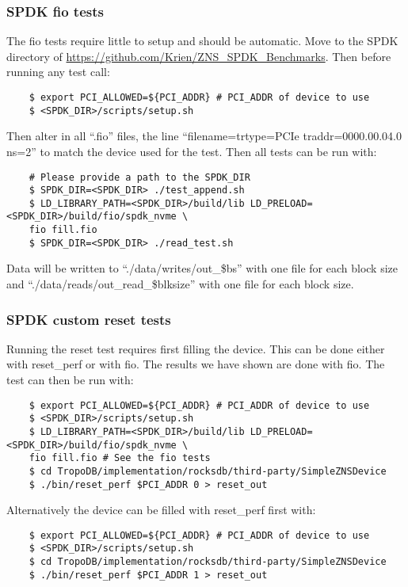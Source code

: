 \subsubsection{SPDK fio tests}
The fio tests require little to setup and should be automatic. Move to the SPDK directory of \url{https://github.com/Krien/ZNS_SPDK_Benchmarks}. Then before running any test call:
\begin{verbatim}
    $ export PCI_ALLOWED=${PCI_ADDR} # PCI_ADDR of device to use
    $ <SPDK_DIR>/scripts/setup.sh
\end{verbatim}
Then alter in all ``.fio'' files, the line ``filename=trtype=PCIe traddr=0000.00.04.0 ns=2'' to match the device used for the test. Then all tests can be run with:
\begin{verbatim}
    # Please provide a path to the SPDK_DIR
    $ SPDK_DIR=<SPDK_DIR> ./test_append.sh
    $ LD_LIBRARY_PATH=<SPDK_DIR>/build/lib LD_PRELOAD=<SPDK_DIR>/build/fio/spdk_nvme \ 
    fio fill.fio
    $ SPDK_DIR=<SPDK_DIR> ./read_test.sh
\end{verbatim}
Data will be written to ``./data/writes/out\_\$bs'' with one file for each block size and ``./data/reads/out\_read\_\$blksize'' with one file for each block size. 

\subsubsection{SPDK custom reset tests}
Running the reset test requires first filling the device. This can be done either with reset\_perf or with fio. The results we have shown are done with fio. The test can then be run with:
\begin{verbatim}
    $ export PCI_ALLOWED=${PCI_ADDR} # PCI_ADDR of device to use
    $ <SPDK_DIR>/scripts/setup.sh
    $ LD_LIBRARY_PATH=<SPDK_DIR>/build/lib LD_PRELOAD=<SPDK_DIR>/build/fio/spdk_nvme \ 
    fio fill.fio # See the fio tests
    $ cd TropoDB/implementation/rocksdb/third-party/SimpleZNSDevice
    $ ./bin/reset_perf $PCI_ADDR 0 > reset_out
\end{verbatim}
Alternatively the device can be filled with reset\_perf first with:
\begin{verbatim}
    $ export PCI_ALLOWED=${PCI_ADDR} # PCI_ADDR of device to use
    $ <SPDK_DIR>/scripts/setup.sh
    $ cd TropoDB/implementation/rocksdb/third-party/SimpleZNSDevice
    $ ./bin/reset_perf $PCI_ADDR 1 > reset_out
\end{verbatim}

